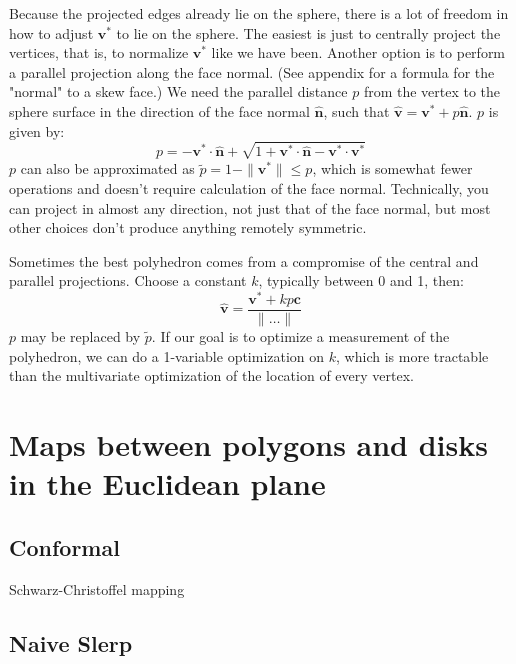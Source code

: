 \documentclass{amsart}[12pt]
\begin{document}
Because the projected edges already lie on the sphere, there is a lot of
freedom in how to adjust $\mathbf v^*$ to lie on the sphere. The
easiest is just to centrally project the vertices, that is, to normalize
$\mathbf v^*$ like we have been. Another option is to perform a parallel
projection along the face normal. (See appendix for a formula for the "normal"
to a skew face.) We need the parallel distance $p$ from the vertex to the
sphere surface in the direction of the face normal $\hat{\mathbf n}$,
such that $\hat{\mathbf v} = \mathbf v^* + p\hat{\mathbf n}$.
$p$ is given by:
\begin{equation}
   p = -\mathbf v^* \cdot \hat{\mathbf n} +
   \sqrt{1+\mathbf v^* \cdot \hat{\mathbf n}-\mathbf v^* \cdot \mathbf v^*}
\end{equation}
$p$ can also be approximated as $\widetilde{p} = 1 - \|\mathbf v^*\|
\leq p$, which is somewhat fewer operations and doesn't require
calculation of the face normal. Technically, you can project in almost any
direction, not just that of the face normal, but most other choices don't
produce anything remotely symmetric.

Sometimes the best polyhedron comes from a compromise of the central and
parallel projections. Choose a constant $k$, typically between 0 and 1, then:
\begin{equation}
  \hat{\mathbf v} = \frac{\mathbf v^* + kp\mathbf c}{\|\dots\|}
\end{equation}
$p$ may be replaced by $\widetilde{p}$. If our goal is to optimize a
measurement of the polyhedron, we can do a 1-variable optimization on $k$,
which is more tractable than the multivariate optimization of the location of
every vertex.

\section{Maps between polygons and disks in the Euclidean plane}
\subsection{Conformal}
Schwarz-Christoffel mapping
\subsection{Naive Slerp}



\end{document}
